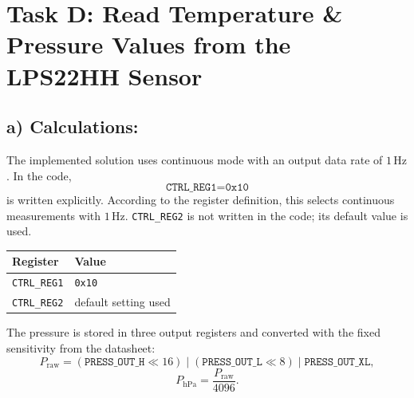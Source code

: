 
\section{Task D: Read Temperature \& Pressure Values from the LPS22HH Sensor}

\subsection{a) Calculations:}

The implemented solution uses continuous mode with an output data rate of $1\,\mathrm{Hz}$. In the code,
\[
	\texttt{CTRL\_REG1} = \texttt{0x10}
\]
is written explicitly. According to the register definition, this selects continuous measurements with $1\,\mathrm{Hz}$. \texttt{CTRL\_REG2} is not written in the code; its default value is used.

\begin{table}[H]
	\centering
	\begin{tabularx}{\textwidth}{|>{\raggedright\arraybackslash}X|>{\raggedright\arraybackslash}X|}
		\hline
		\textbf{Register}   & \textbf{Value}                               \\ \hline
		\texttt{CTRL\_REG1} & \texttt{0x10}                                \\ \hline
		\texttt{CTRL\_REG2} & default setting used                          \\ \hline
	\end{tabularx}
\end{table}

The pressure is stored in three output registers and converted with the fixed sensitivity from the datasheet:
\[
	P_{\mathrm{raw}} = (\texttt{PRESS\_OUT\_H} \ll 16)\;|\;(\texttt{PRESS\_OUT\_L} \ll 8)\;|\;\texttt{PRESS\_OUT\_XL},
\]
\[
	P_{\mathrm{hPa}} = \frac{P_{\mathrm{raw}}}{4096}.
\]

